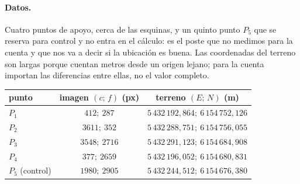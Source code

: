 \paragraph{Datos.} Cuatro puntos de apoyo, cerca de las esquinas, y un quinto punto
\(P_5\) que se reserva para control y no entra en el cálculo: es el poste que no medimos para
la cuenta y que nos va a decir si la ubicación es buena. Las coordenadas del terreno son largas
porque cuentan metros desde un origen lejano; para la cuenta importan las diferencias entre
ellas, no el valor completo.
\begin{center}
\begin{tabular}{lcc}
\toprule
punto & imagen \((c;\,f)\) (px) & terreno \((E;\,N)\) (m)\\
\midrule
\(P_1\) & \(412;\ 287\) & \(5\,432\,192{,}864;\ 6\,154\,752{,}126\)\\
\(P_2\) & \(3611;\ 352\) & \(5\,432\,288{,}751;\ 6\,154\,756{,}055\)\\
\(P_3\) & \(3548;\ 2716\) & \(5\,432\,291{,}123;\ 6\,154\,684{,}908\)\\
\(P_4\) & \(377;\ 2659\) & \(5\,432\,196{,}052;\ 6\,154\,680{,}831\)\\
\midrule
\(P_5\) (control) & \(1980;\ 2905\) & \(5\,432\,244{,}512;\ 6\,154\,676{,}380\)\\
\bottomrule
\end{tabular}
\end{center}

